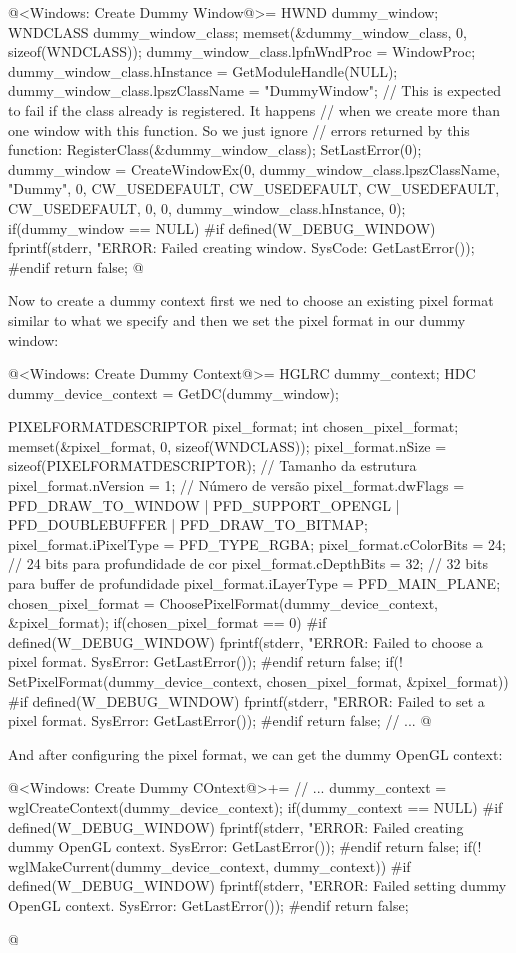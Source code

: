 \iniciocodigo
@<Windows: Create Dummy Window@>=
HWND dummy_window;
{
  WNDCLASS dummy_window_class;
  memset(&dummy_window_class, 0, sizeof(WNDCLASS));
  dummy_window_class.lpfnWndProc = WindowProc;
  dummy_window_class.hInstance = GetModuleHandle(NULL);
  dummy_window_class.lpszClassName = "DummyWindow";
  // This is expected to fail if the class already is registered. It happens
  // when we create more than one window with this function. So we just ignore
  // errors returned by this function:
  RegisterClass(&dummy_window_class);
  SetLastError(0);
  dummy_window = CreateWindowEx(0, dummy_window_class.lpszClassName, "Dummy",
                                0, CW_USEDEFAULT, CW_USEDEFAULT, CW_USEDEFAULT,
                                CW_USEDEFAULT, 0, 0,
                                dummy_window_class.hInstance, 0);
  if(dummy_window == NULL){
#if defined(W_DEBUG_WINDOW)
    fprintf(stderr, "ERROR: Failed creating window. SysCode: %
            GetLastError());
#endif
    return false;
  }
}
@
\fimcodigo

Now to create a dummy context first we ned to choose an existing pixel
format similar to what we specify and then we set the pixel format in
our dummy window:

\iniciocodigo
@<Windows: Create Dummy Context@>=
HGLRC dummy_context;
HDC dummy_device_context = GetDC(dummy_window);
{
  PIXELFORMATDESCRIPTOR pixel_format;
  int chosen_pixel_format;
  memset(&pixel_format, 0, sizeof(WNDCLASS));
  pixel_format.nSize = sizeof(PIXELFORMATDESCRIPTOR); // Tamanho da estrutura
  pixel_format.nVersion = 1; // Número de versão
  pixel_format.dwFlags = PFD_DRAW_TO_WINDOW | PFD_SUPPORT_OPENGL |
                         PFD_DOUBLEBUFFER | PFD_DRAW_TO_BITMAP;
  pixel_format.iPixelType = PFD_TYPE_RGBA;
  pixel_format.cColorBits = 24; // 24 bits para profundidade de cor
  pixel_format.cDepthBits = 32; // 32 bits para buffer de profundidade
  pixel_format.iLayerType = PFD_MAIN_PLANE;
  chosen_pixel_format = ChoosePixelFormat(dummy_device_context, &pixel_format);
  if(chosen_pixel_format == 0){
#if defined(W_DEBUG_WINDOW)
    fprintf(stderr, "ERROR: Failed to choose a pixel format. SysError: %
            GetLastError());
#endif
    return false;
  }
  if(! SetPixelFormat(dummy_device_context, chosen_pixel_format, &pixel_format)){
#if defined(W_DEBUG_WINDOW)
    fprintf(stderr, "ERROR: Failed to set a pixel format. SysError: %
            GetLastError());
#endif
    return false;
  }
  // ...
@
\fimcodigo

And after configuring the pixel format, we can get the dummy OpenGL
context:

\iniciocodigo
@<Windows: Create Dummy COntext@>+=
  // ...
  dummy_context = wglCreateContext(dummy_device_context);
  if(dummy_context == NULL){
#if defined(W_DEBUG_WINDOW)
    fprintf(stderr, "ERROR: Failed creating dummy OpenGL context. SysError: %
            GetLastError());
#endif
    return false;
  }
  if(! wglMakeCurrent(dummy_device_context, dummy_context)){
#if defined(W_DEBUG_WINDOW)
    fprintf(stderr, "ERROR: Failed setting dummy OpenGL context. SysError: %
            GetLastError());
#endif
    return false;
  }
}
@
\fimcodigo

